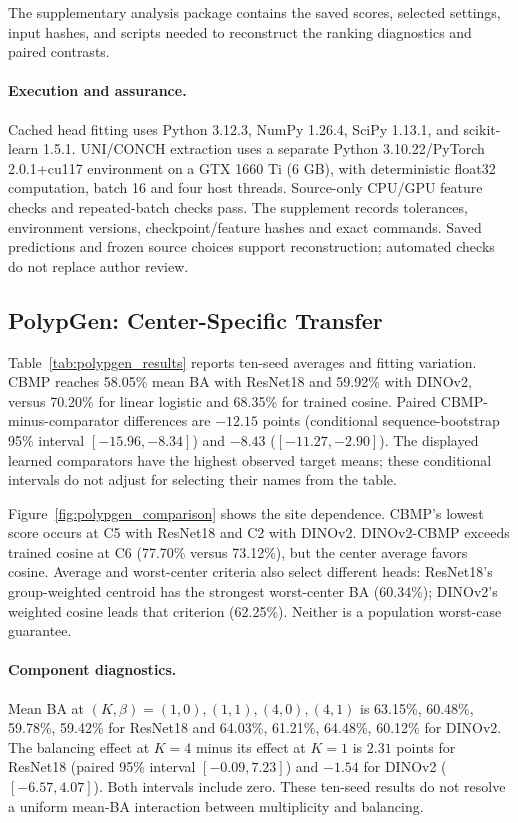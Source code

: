 The supplementary analysis package contains the saved scores, selected settings, input hashes, and scripts needed to reconstruct the ranking diagnostics and paired contrasts.


\paragraph{Execution and assurance.}
Cached head fitting uses Python 3.12.3, NumPy 1.26.4, SciPy 1.13.1, and scikit-learn 1.5.1. UNI/CONCH extraction uses a separate Python 3.10.22/PyTorch 2.0.1+cu117 environment on a GTX 1660 Ti (6 GB), with deterministic float32 computation, batch 16 and four host threads. Source-only CPU/GPU feature checks and repeated-batch checks pass. The supplement records tolerances, environment versions, checkpoint/feature hashes and exact commands. Saved predictions and frozen source choices support reconstruction; automated checks do not replace author review.


\subsection{PolypGen: Center-Specific Transfer}
Table~\ref{tab:polypgen_results} reports ten-seed averages and fitting variation. CBMP reaches 58.05\% mean BA with ResNet18 and 59.92\% with DINOv2, versus 70.20\% for linear logistic and 68.35\% for trained cosine. Paired CBMP-minus-comparator differences are $-12.15$ points (conditional sequence-bootstrap 95\% interval $[-15.96,-8.34]$) and $-8.43$ ($[-11.27,-2.90]$). The displayed learned comparators have the highest observed target means; these conditional intervals do not adjust for selecting their names from the table.

Figure~\ref{fig:polypgen_comparison} shows the site dependence. CBMP's lowest score occurs at C5 with ResNet18 and C2 with DINOv2. DINOv2-CBMP exceeds trained cosine at C6 (77.70\% versus 73.12\%), but the center average favors cosine. Average and worst-center criteria also select different heads: ResNet18's group-weighted centroid has the strongest worst-center BA (60.34\%); DINOv2's weighted cosine leads that criterion (62.25\%). Neither is a population worst-case guarantee.







\paragraph{Component diagnostics.}
Mean BA at $(K,\beta)=(1,0),(1,1),(4,0),(4,1)$ is 63.15\%, 60.48\%, 59.78\%, 59.42\% for ResNet18 and 64.03\%, 61.21\%, 64.48\%, 60.12\% for DINOv2. The balancing effect at $K=4$ minus its effect at $K=1$ is $2.31$ points for ResNet18 (paired 95\% interval $[-0.09,7.23]$) and $-1.54$ for DINOv2 ($[-6.57,4.07]$). Both intervals include zero. These ten-seed results do not resolve a uniform mean-BA interaction between multiplicity and balancing.

